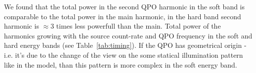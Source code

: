 We found that the total power in the second QPO harmonic in the soft band is comparable to the total power in the main harmonic, in the hard band second harmonic is $\approx3$ times less powerfull than the main. 
Total power of the harmonics growing with the source count-rate and QPO frequency in the soft and hard energy bands (see Table~\ref{tab:timing}). 
If the QPO has geometrical origin - i.e. it's due to the change of the view on the some statical illumination pattern like in the \citep{IVK09} model, than this pattern is more complex in the soft energy band. 


